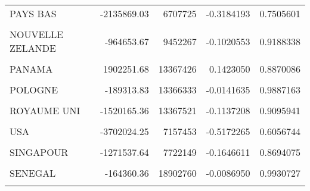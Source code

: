 \documentclass[
]{book}
\begin{document}
\begin{table}
\begin{tabular}[t]{l|r|r|r|r}
\hline
\cellcolor{gray!6}{NERLAND} & \cellcolor{gray!6}{-1458943.80} & \cellcolor{gray!6}{18905086} & \cellcolor{gray!6}{-0.0771720} & \cellcolor{gray!6}{0.9385780}\\
\hline
PAYS BAS & -2135869.03 & 6707725 & -0.3184193 & 0.7505601\\
\hline
\cellcolor{gray!6}{NIGERIA} & \cellcolor{gray!6}{69469.46} & \cellcolor{gray!6}{13366251} & \cellcolor{gray!6}{0.0051974} & \cellcolor{gray!6}{0.9958592}\\
\hline
NOUVELLE ZELANDE & -964653.67 & 9452267 & -0.1020553 & 0.9188338\\
\hline
\cellcolor{gray!6}{OUGANDA} & \cellcolor{gray!6}{-9660163.23} & \cellcolor{gray!6}{6259154} & \cellcolor{gray!6}{-1.5433657} & \cellcolor{gray!6}{0.1246125}\\
\hline
PANAMA & 1902251.68 & 13367426 & 0.1423050 & 0.8870086\\
\hline
\cellcolor{gray!6}{PHILLIPINE} & \cellcolor{gray!6}{377090.25} & \cellcolor{gray!6}{18902684} & \cellcolor{gray!6}{0.0199490} & \cellcolor{gray!6}{0.9841076}\\
\hline
POLOGNE & -189313.83 & 13366333 & -0.0141635 & 0.9887163\\
\hline
\cellcolor{gray!6}{PORTUGAL} & \cellcolor{gray!6}{-1520165.36} & \cellcolor{gray!6}{9453188} & \cellcolor{gray!6}{-0.1608098} & \cellcolor{gray!6}{0.8724353}\\
\hline
ROYAUME UNI & -1520165.36 & 13367521 & -0.1137208 & 0.9095941\\
\hline
\cellcolor{gray!6}{RDC} & \cellcolor{gray!6}{-10887866.60} & \cellcolor{gray!6}{8575838} & \cellcolor{gray!6}{-1.2695980} & \cellcolor{gray!6}{0.2059733}\\
\hline
USA & -3702024.25 & 7157453 & -0.5172265 & 0.6056744\\
\hline
\cellcolor{gray!6}{RWANDA} & \cellcolor{gray!6}{-2745202.66} & \cellcolor{gray!6}{6429503} & \cellcolor{gray!6}{-0.4269697} & \cellcolor{gray!6}{0.6699449}\\
\hline
SINGAPOUR & -1271537.64 & 7722149 & -0.1646611 & 0.8694075\\
\hline
\cellcolor{gray!6}{SUISSE} & \cellcolor{gray!6}{-6428958.73} & \cellcolor{gray!6}{6084800} & \cellcolor{gray!6}{-1.0565604} & \cellcolor{gray!6}{0.2922202}\\
\hline
SENEGAL & -164360.36 & 18902760 & -0.0086950 & 0.9930727\\
\hline
\cellcolor{gray!6}{SOMALIE} & \cellcolor{gray!6}{182031.20} & \cellcolor{gray!6}{18902817} & \cellcolor{gray!6}{0.0096298} & \cellcolor{gray!6}{0.9923280}\\

\end{tabular}
\end{table}
\end{document}
